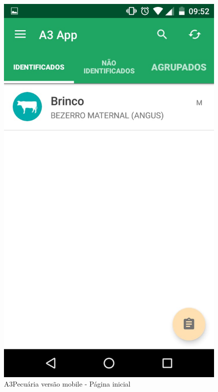 \documentclass[12pt]{article}
\begin{document}
\begin{titlepage}
\begin{figure}[!h]
\begin{center}
\caption{A3Pecuária versão mobile - Página inicial}
\includegraphics[width=6in]{img/a3pecuariaapp1.jpeg}

\end{center}
\end{figure}


\end{titlepage}
\end{document}
